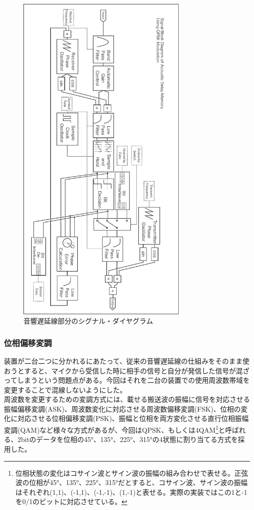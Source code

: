 \documentclass[a4paper,report]{jsbook}
\begin{document}
\begin{figure}[htbp]
\centering
\includegraphics[width=0.75000\textwidth]{./img/adm2_diagram.pdf}
\caption{音響遅延線部分のシグナル・ダイヤグラム\label{fig:adm2diagram}}
\end{figure}

\subsubsection{位相偏移変調}\label{ux4f4dux76f8ux504fux79fbux5909ux8abf}

装置が二台二つに分かれるにあたって、従来の音響遅延線の仕組みをそのまま使おうとすると、マイクから受信した時に相手の信号と自分が発信した信号が混ざってしまうという問題点がある。今回はそれを二台の装置での使用周波数帯域を変更することで混線しないようにした。\\
周波数を変更するための変調方式には、載せる搬送波の振幅に信号を対応させる振幅偏移変調(ASK)、周波数変化に対応させる周波数偏移変調(FSK)、位相の変化に対応させる位相偏移変調(PSK)、振幅と位相を両方変化させる直行位相振幅変調(QAM)など様々な方式があるが、今回はQPSK、もしくは4QAM\footnote{位相状態の変化はコサイン波とサイン波の振幅の組み合わせで表せる。正弦波の位相が45°、135°、225°、315°だとすると、コサイン波、サイン波の振幅はそれぞれ(1,1)、(-1,1)、(-1,-1)、(1,-1)と表せる。実際の実装ではこの1と-1を0/1のビットに対応させている。}と呼ばれる、2bitのデータを位相の45°、135°、225°、315°の4状態に割り当てる方式を採用した。
\end{document}
